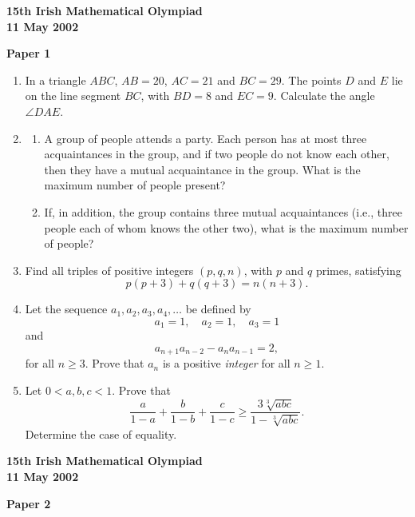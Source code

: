 \documentclass[12pt]{article}
\begin{document}
\begin{center}
{\large\bfseries 15th Irish Mathematical Olympiad\\11 May 2002}
\end{center}
\bigskip\noindent\textbf{Paper 1}\bigskip
\begin{enumerate}
\item In a triangle $ABC$, $AB = 20$, $AC = 21$ and $BC = 29$. The points $D$ and $E$ lie on the line segment $BC$, with $BD = 8$ and $EC = 9$. Calculate the angle $\angle DAE$.

\item \begin{enumerate}
\item[(a)] A group of people attends a party. Each person has at most three acquaintances in the group, and if two people do not know each other, then they have a mutual acquaintance in the group. What is the maximum number of people present?
\item[(b)] If, in addition, the group contains three mutual acquaintances (i.e., three people each of whom knows the other two), what is the maximum number of people?
\end{enumerate}

\item Find all triples of positive integers $(p, q, n)$, with $p$ and $q$ primes, satisfying
\[
p(p+3) + q(q+3) = n(n+3).
\]

\item Let the sequence $a_1, a_2, a_3, a_4, \ldots$ be defined by
\[
a_1 = 1, \quad a_2 = 1, \quad a_3 = 1
\]
and
\[
a_{n+1}a_{n-2} - a_n a_{n-1} = 2,
\]
for all $n \geq 3$. Prove that $a_n$ is a positive \textit{integer} for all $n \geq 1$.

\item Let $0 < a, b, c < 1$. Prove that
\[
\frac{a}{1-a} + \frac{b}{1-b} + \frac{c}{1-c} \geq \frac{3\sqrt[3]{abc}}{1 - \sqrt[3]{abc}}.
\]
Determine the case of equality.

\end{enumerate}
\newpage
\begin{center}
{\large\bfseries 15th Irish Mathematical Olympiad\\11 May 2002}
\end{center}
\bigskip\noindent\textbf{Paper 2}\bigskip
\end{document}
